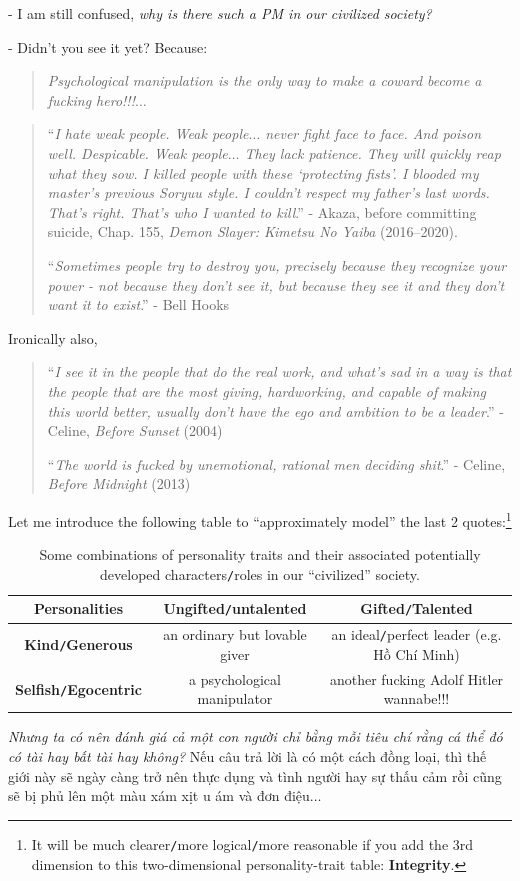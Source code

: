 \documentclass[12pt]{article}
\begin{document}
- I am still confused, {\it why is there such a PM in our civilized society?}

- Didn't you see it yet? Because:
\begin{quotation}
	{\it Psychological manipulation is the only way to make a coward become a fucking hero!!!}$\ldots$
\end{quotation}

\begin{quotation}
	``{\it I hate weak people. Weak people$\ldots$ never fight face to face. And poison well. Despicable. Weak people$\ldots$ They lack patience. They will quickly reap what they sow. I killed people with these `protecting fists'. I blooded my master's previous Soryuu style. I couldn't respect my father's last words. That's right. That's who I wanted to kill}.'' - Akaza, before committing suicide, Chap. 155, {\it Demon Slayer: Kimetsu No Yaiba} (2016--2020).
	
	``{\it Sometimes people try to destroy you, precisely because they recognize your power - not because they don't see it, but because they see it and they don't want it to exist}.'' - Bell Hooks
\end{quotation}
Ironically also,

\begin{quotation}
	``{\it I see it in the people that do the real work, and what's sad in a way is that the people that are the most giving, hardworking, and capable of making this world better, usually don't have the ego and ambition to be a leader}.'' - Celine, {\it Before Sunset} (2004)
	
	``{\it The world is fucked by unemotional, rational men deciding shit}.'' - Celine, {\it Before Midnight} (2013)
\end{quotation}
Let me introduce the following table to ``approximately model'' the last 2 quotes:\footnote{It will be much clearer{\tt/}more logical{\tt/}more reasonable if you add the 3rd dimension to this two-dimensional personality-trait table: \textbf{Integrity}.}

\begin{table}[h]
	\centering
	\begin{tabular}{|c|c|c|}
		\hline
		{\sc Personalities}& \textbf{Ungifted{\tt/}untalented} & \textbf{Gifted{\tt/}Talented} \\
		\hline
		\textbf{Kind{\tt/}Generous} & an ordinary but lovable giver & an ideal{\tt/}perfect leader (e.g. Hồ Chí Minh) \\
		\hline
		\textbf{Selfish{\tt/}Egocentric} & a psychological manipulator & another fucking Adolf Hitler wannabe!!! \\
		\hline
	\end{tabular}
	\caption{Some combinations of personality traits and their associated potentially developed characters{\tt/}roles in our ``civilized'' society.}
\end{table}
{\it Nhưng ta có nên đánh giá cả một con người chỉ bằng mỗi tiêu chí rằng cá thể đó có tài hay bất tài hay không?} Nếu câu trả lời là có một cách đồng loại, thì thế giới này sẽ ngày càng trở nên thực dụng và tình người hay sự thấu cảm rồi cũng sẽ bị phủ lên một màu xám xịt u ám và đơn điệu$\ldots$
\end{document}
